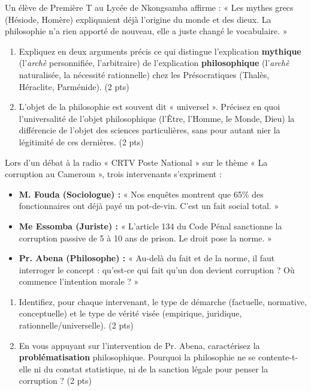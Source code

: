 \documentclass[11pt]{article}
\begin{document}
\begin{exercice}
Un élève de Première T au Lycée de Nkongsamba affirme : « Les mythes grecs (Hésiode, Homère) expliquaient déjà l'origine du monde et des dieux. La philosophie n'a rien apporté de nouveau, elle a juste changé le vocabulaire. »
\begin{enumerate}
    \item Expliquez en deux arguments précis ce qui distingue l'explication \textbf{mythique} (l'\textit{archè} personnifiée, l'arbitraire) de l'explication \textbf{philosophique} (l'\textit{archè} naturalisée, la nécessité rationnelle) chez les Présocratiques (Thalès, Héraclite, Parménide). (2 pts)
    \item L'objet de la philosophie est souvent dit « universel ». Précisez en quoi l'universalité de l'objet philosophique (l'Être, l'Homme, le Monde, Dieu) la différencie de l'objet des sciences particulières, sans pour autant nier la légitimité de ces dernières. (2 pts)
\end{enumerate}
\end{exercice}

\begin{exercice}
Lors d'un débat à la radio « CRTV Poste National » sur le thème « La corruption au Cameroun », trois intervenants s'expriment :
\begin{itemize}
    \item \textbf{M. Fouda (Sociologue) :} « Nos enquêtes montrent que 65\% des fonctionnaires ont déjà payé un pot-de-vin. C'est un fait social total. »
    \item \textbf{Me Essomba (Juriste) :} « L'article 134 du Code Pénal sanctionne la corruption passive de 5 à 10 ans de prison. Le droit pose la norme. »
    \item \textbf{Pr. Abena (Philosophe) :} « Au-delà du fait et de la norme, il faut interroger le concept : qu'est-ce qui fait qu'un don devient corruption ? Où commence l'intention morale ? »
\end{itemize}
\begin{enumerate}
    \item Identifiez, pour chaque intervenant, le type de démarche (factuelle, normative, conceptuelle) et le type de vérité visée (empirique, juridique, rationnelle/universelle). (2 pts)
    \item En vous appuyant sur l'intervention de Pr. Abena, caractérisez la \textbf{problématisation} philosophique. Pourquoi la philosophie ne se contente-t-elle ni du constat statistique, ni de la sanction légale pour penser la corruption ? (2 pts)
\end{enumerate}
\end{exercice}
\end{document}
